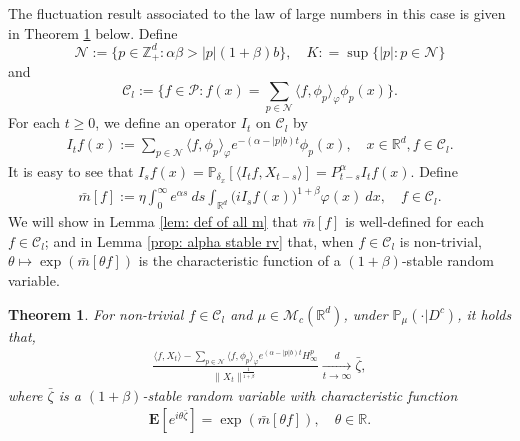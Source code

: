 \documentclass[12pt,a4paper]{amsart}
\theoremstyle{plain}
\newtheorem{thm}{Theorem}[section]
\theoremstyle{definition}
\numberwithin{equation}{section}
\begin{document}
   The fluctuation result associated to the law of large numbers in this case is
    given in Theorem \ref{thm: large clt} below.
Define
\begin{equation}
\label{eq: def of N}
    \mathcal{N}:=\{p\in \mathbb{Z}_+^d:  \alpha\beta>|p|(1+\beta)b\},
    \quad K : = \sup\{|p|: p \in \mathcal N\}
\end{equation}
    and
\begin{equation}
\label{eq: def of Cl}
    \mathcal{C}_l:=\Big\{f\in \mathcal P: f(x)=\sum_{p\in\mathcal{N}}\langle f, \phi_p\rangle_{\varphi}\phi_p(x)\Big\}.
\end{equation}
    For each $t\ge 0$, we define an operator $I_t$ on $\mathcal{C}_l$ by
\begin{align}\label{definition of Itf}
    I_tf(x)
    :=\sum_{p\in \mathcal{N}}\langle f, \phi_p\rangle_{\varphi} e^{-(\alpha-|p|b)t}\phi_p(x),
   \quad x\in \mathbb{R}^d, f\in \mathcal C_l.
\end{align}
    It is easy to see that $I_sf(x)=\mathbb{P}_{\delta_x}[\langle I_t f, X_{t-s}\rangle]=P_{t-s}^{\alpha}I_tf(x)$.
    Define
\begin{align}\label{bar-m}
   \bar{m}[f]
   :=\eta \int_{0}^{\infty} e^{\alpha s}~ds \int_{\mathbb R^d} \big(iI_sf(x)\big)^{1+\beta}\varphi(x)~dx,
   \quad f\in \mathcal C_l.
\end{align}
    We will show in Lemma \ref{lem: def of all m} that $\bar{m}[f]$ is well-defined for each $f\in \mathcal C_l$; and in Lemma \ref{prop: alpha stable rv} that, 
    when $f\in \mathcal C_l$ is non-trivial,
    $\theta \mapsto \exp( \bar m[\theta f])$ is the characteristic
    function of a $(1+\beta)$-stable random variable.
\begin{thm}
\label{thm: large clt}
    For non-trivial $f\in\mathcal{C}_l$ and $\mu\in \mathcal{M}_c(\mathbb{R}^d)$, under $\mathbb{P}_{\mu}(\cdot|D^c)$, it holds that,
\begin{align}\label{thm: large rate}
    \frac{\langle f, X_t\rangle-\sum_{p\in\mathcal{N}}\langle f,\phi_p\rangle_\varphi e^{(\alpha-|p|b)t}H^p_{\infty}}{\|X_t\|^\frac{1}{1+\beta}}\xrightarrow[t\to \infty]{d}\bar{\zeta},
\end{align}
    where $\bar{\zeta}$ is a $(1+\beta)$-stable random variable with characteristic function
\begin{align}
    \mathbf{E}[e^{i\theta\bar{\zeta}}]=\exp(\bar{m}[\theta f]),\quad \theta\in \mathbb{R}.
\end{align}
\end{thm}
\end{document}
